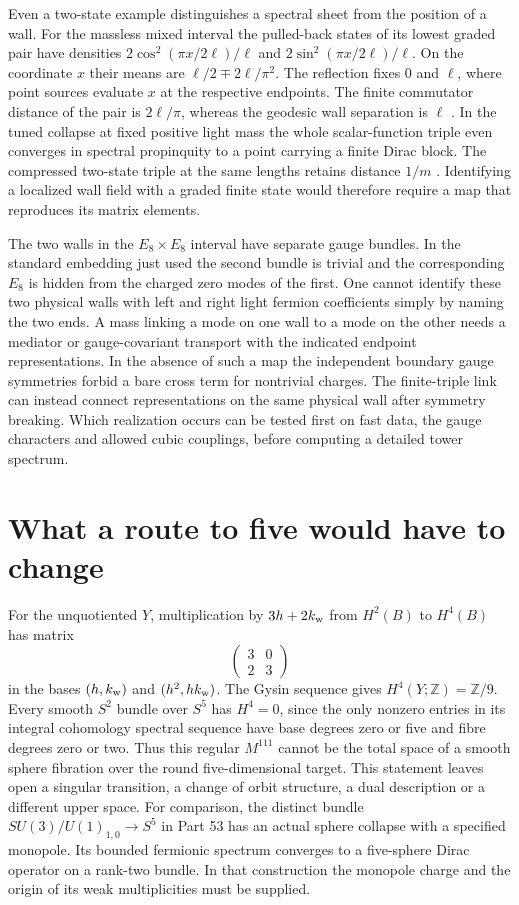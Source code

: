 \documentclass[aps,prd,reprint,onecolumn,nofootinbib,amsmath,amssymb]{revtex4-2}
\begin{document}
Even a two-state example distinguishes a spectral sheet from the position of a wall. For the massless mixed interval the pulled-back states of its lowest graded pair have densities $2\cos^2(\pi x/2\ell)/\ell$ and $2\sin^2(\pi x/2\ell)/\ell$. On the coordinate $x$ their means are $\ell/2\mp2\ell/\pi^2$. The reflection fixes $0$ and $\ell$, where point sources evaluate $x$ at the respective endpoints. The finite commutator distance of the pair is $2\ell/\pi$, whereas the geodesic wall separation is $\ell$ \cite{towerlesspaper,dictionarynote}. In the tuned collapse at fixed positive light mass the whole scalar-function triple even converges in spectral propinquity to a point carrying a finite Dirac block. The compressed two-state triple at the same lengths retains distance $1/m$ \cite{towerlesspaper}. Identifying a localized wall field with a graded finite state would therefore require a map that reproduces its matrix elements.

The two walls in the $E_8\times E_8$ interval have separate gauge bundles. In the standard embedding just used the second bundle is trivial and the corresponding $E_8$ is hidden from the charged zero modes of the first. One cannot identify these two physical walls with left and right light fermion coefficients simply by naming the two ends. A mass linking a mode on one wall to a mode on the other needs a mediator or gauge-covariant transport with the indicated endpoint representations. In the absence of such a map the independent boundary gauge symmetries forbid a bare cross term for nontrivial charges. The finite-triple link can instead connect representations on the same physical wall after symmetry breaking. Which realization occurs can be tested first on fast data, the gauge characters and allowed cubic couplings, before computing a detailed tower spectrum.

\section{What a route to five would have to change}
For the unquotiented $Y$, multiplication by $3h+2k_{\rm w}$ from $H^2(B)$ to $H^4(B)$ has matrix
\begin{equation}
 \begin{pmatrix}3&0\\2&3\end{pmatrix}
\end{equation}
in the bases $(h,k_{\rm w})$ and $(h^2,hk_{\rm w})$. The Gysin sequence gives $H^4(Y;\mathbb Z)=\mathbb Z/9$. Every smooth $S^2$ bundle over $S^5$ has $H^4=0$, since the only nonzero entries in its integral cohomology spectral sequence have base degrees zero or five and fibre degrees zero or two. Thus this regular $M^{111}$ cannot be the total space of a smooth sphere fibration over the round five-dimensional target. This statement leaves open a singular transition, a change of orbit structure, a dual description or a different upper space. For comparison, the distinct bundle $SU(3)/U(1)_{1,0}\to S^5$ in Part 53 has an actual sphere collapse with a specified monopole. Its bounded fermionic spectrum converges to a five-sphere Dirac operator on a rank-two bundle. In that construction the monopole charge and the origin of its weak multiplicities must be supplied.
\end{document}

